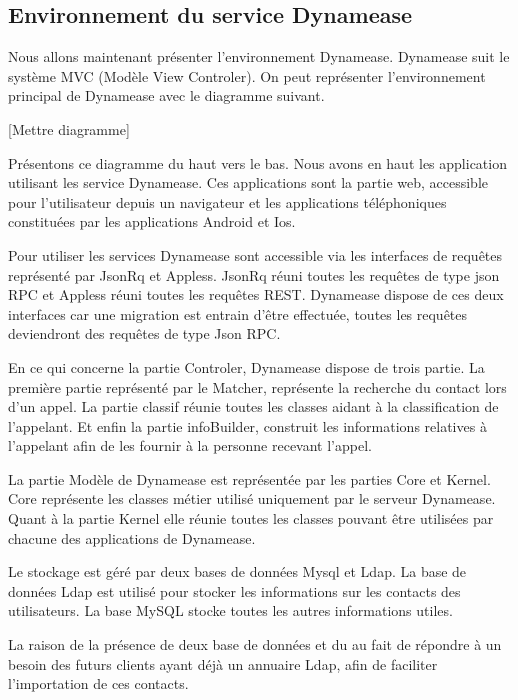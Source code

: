 \subsection{Environnement du service Dynamease}

Nous allons maintenant présenter l'environnement Dynamease. Dynamease suit le système MVC (Modèle View Controler). On peut représenter l'environnement principal de Dynamease avec le diagramme suivant.

[Mettre diagramme]

Présentons ce diagramme du haut vers le bas. Nous avons en haut les application utilisant les service Dynamease. Ces applications sont la partie web, accessible pour l'utilisateur depuis un navigateur et les applications téléphoniques constituées par les applications Android et Ios.

Pour utiliser les services Dynamease sont accessible via les interfaces de requêtes représenté par JsonRq et Appless. JsonRq réuni toutes les requêtes de type json RPC et Appless réuni toutes les requêtes REST. Dynamease dispose de ces deux interfaces car une migration est entrain d'être effectuée, toutes les requêtes deviendront des requêtes de type Json RPC.

En ce qui concerne la partie Controler, Dynamease dispose de trois partie. La première partie représenté par le Matcher, représente la recherche du contact lors d'un appel. La partie classif réunie toutes les classes aidant à la classification de l'appelant. Et enfin la partie infoBuilder, construit les informations relatives à l'appelant afin de les fournir à la personne recevant l'appel.

La partie Modèle de Dynamease est représentée par les parties Core et Kernel. Core représente les classes métier utilisé uniquement par le serveur Dynamease. Quant à la partie Kernel elle réunie toutes les classes pouvant être utilisées par chacune des applications de Dynamease.

Le stockage est géré par deux bases de données Mysql et Ldap. La base de données Ldap est utilisé pour stocker les informations sur les contacts des utilisateurs. La base MySQL stocke toutes les autres informations utiles.

La raison de la présence de deux base de données et du au fait de répondre à un besoin des futurs clients ayant déjà un annuaire Ldap, afin de faciliter l'importation de ces contacts.